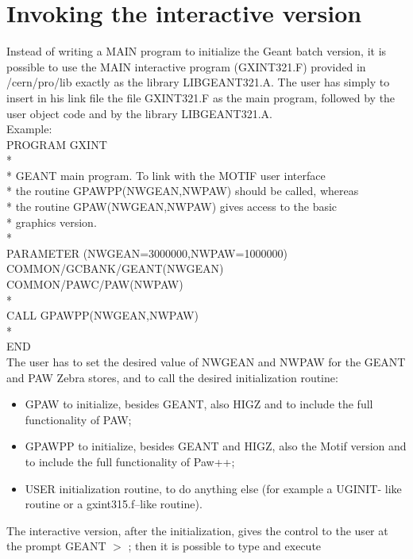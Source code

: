 \section{Invoking the interactive version}
Instead of writing a MAIN program to initialize the Geant batch
version, it is possible to use the MAIN interactive program (GXINT321.F)
provided in /cern/pro/lib exactly as the library LIBGEANT321.A. The user
has simply to insert in his link file the file GXINT321.F as the main
program, followed by the user object code and by the library LIBGEANT321.A.
\\[.5em] Example: \\[.1em]
       PROGRAM GXINT \\[.1em]
* \\[.1em]
*     GEANT main program. To link with the MOTIF user interface \\[.1em]
*     the routine GPAWPP(NWGEAN,NWPAW) should be called, whereas \\[.1em]
*     the routine GPAW(NWGEAN,NWPAW) gives access to the basic \\[.1em]
*     graphics version. \\[.1em]
* \\[.1em]
      PARAMETER (NWGEAN=3000000,NWPAW=1000000) \\[.1em]
      COMMON/GCBANK/GEANT(NWGEAN) \\[.1em]
      COMMON/PAWC/PAW(NWPAW) \\[.1em]
* \\[.1em]
      CALL GPAWPP(NWGEAN,NWPAW) \\[.1em]
* \\[.1em]
      END \\[.5em]
The user has to set the desired value of NWGEAN and NWPAW for the
GEANT and PAW Zebra stores, and to call the desired initialization routine:
\begin{itemize}
\item GPAW to initialize, besides GEANT, also HIGZ and to include the full
      functionality of PAW;
\item GPAWPP to initialize, besides GEANT and HIGZ, also the Motif version 
      and to include the full functionality of Paw++;
\item USER initialization routine, to do anything else (for example a UGINIT-
      like routine or a gxint315.f--like routine). 
\end{itemize}
The interactive version, after the initialization, gives the control to the
user at the prompt GEANT $>$ ; then it is possible to type and execute 
